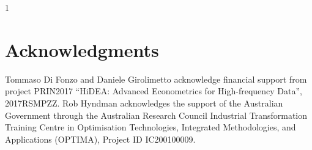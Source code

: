 \documentclass[a4paper,11pt]{article}
\newcommand{\blind}{1}
\theoremstyle{definition}
\begin{document}
\appendix
\setcounter{table}{0}
\renewcommand{\thetable}{\Alph{section}.\arabic{table}}

\blind
{
\section*{Acknowledgments}

\noindent Tommaso Di Fonzo and Daniele Girolimetto acknowledge financial support from project PRIN2017 “HiDEA: Advanced Econometrics for High-frequency Data”, 2017RSMPZZ. Rob Hyndman acknowledges the support of the Australian Government through the Australian Research Council Industrial Transformation Training Centre in Optimisation Technologies, Integrated Methodologies, and Applications (OPTIMA), Project ID IC200100009.
} \fi




\end{document}
